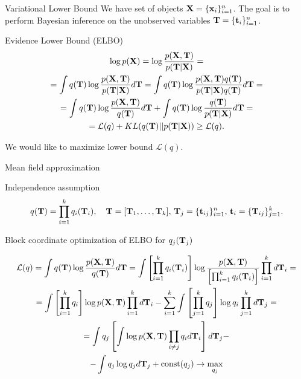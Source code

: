 \begin{frame}{Variational Lower Bound}
    We have set of objects $\mathbf{X} = \{\mathbf{x}_i\}_{i=1}^n$. 
    The goal is to perform Bayesian inference on the unobserved variables $\mathbf{T} = \{\mathbf{t}_i\}_{i=1}^n$.
    \begin{block}{Evidence Lower Bound (ELBO)}
    \vspace{-0.3cm}
        \begin{multline*}
    		\log p(\mathbf{X}) 
    		= \log \frac{p(\mathbf{X}, \mathbf{T})}{p(\mathbf{T}|\mathbf{X})} = \\ 
    		= \int q(\mathbf{T}) \log \frac{p(\mathbf{X}, \mathbf{T})}{p(\mathbf{T}|\mathbf{X})}d\mathbf{T}
    		= \int q(\mathbf{T}) \log \frac{p(\mathbf{X}, \mathbf{T}) q(\mathbf{T})}{p(\mathbf{T}|\mathbf{X}) q(\mathbf{T})} d\mathbf{T} = \\
    		= \int q(\mathbf{T}) \log \frac{p(\mathbf{X}, \mathbf{T})}{q(\mathbf{T})}d\mathbf{T} + \int q(\mathbf{T}) \log \frac{q(\mathbf{T})}{p(\mathbf{T}|\mathbf{X})}d\mathbf{T} = \\ 
    		= \mathcal{L} (q) + KL(q(\mathbf{T}) || p(\mathbf{T}|\mathbf{X})) \geq \mathcal{L} (q).
    	\end{multline*}
        \vspace{-0.3cm}
    \end{block}
	We would like to maximize lower bound $\mathcal{L}(q)$.
\end{frame}
\begin{frame}{Mean field approximation}
    \begin{block}{Independence assumption}
    \vspace{-0.3cm}
    \[
    q(\mathbf{T}) = \prod_{i=1}^k q_i(\mathbf{T}_i), \quad \mathbf{T} = [\mathbf{T}_1, \dots, \mathbf{T}_k], \, \mathbf{T}_j = \{ \mathbf{t}_{ij}\}_{i=1}^n, \, \mathbf{t}_i = \{ \mathbf{T}_{ij}\}_{j=1}^k.
    \]
    \vspace{-0.3cm}
    \end{block}
    \begin{block}{Block coordinate optimization of ELBO for $q_j(\mathbf{T}_j)$}
  
    {\footnotesize
    \vspace{-0.3cm}
        \begin{multline*}
    		\mathcal{L} (q)
    		= \int q(\mathbf{T}) \log \frac{p(\mathbf{X}, \mathbf{T})}{q(\mathbf{T})}d\mathbf{T}
    		= \int \left[\prod_{i=1}^k q_i(\mathbf{T}_i) \right] \log \frac{p(\mathbf{X}, \mathbf{T})}{\left[\prod_{i=1}^k q_i(\mathbf{T}_i) \right]}  \prod_{i=1}^k d \mathbf{T}_i = \\
    		= \int \left[ \prod_{i=1}^k q_i \right] \log p(\mathbf{X}, \mathbf{T}) \prod_{i=1}^k d \mathbf{T}_i  
    		- \sum_{i=1}^k \int \left[ \prod_{j=1}^k q_j \right] \log q_i \prod_{j=1}^k d \mathbf{T}_j = \\
    		= \int q_j \left[\int  \log p(\mathbf{X}, \mathbf{T}) \prod_{i \neq j} q_i d \mathbf{T}_i \right] d \mathbf{T}_j - \\
    		- \int q_j \log q_j d\mathbf{T}_j + \text{const}(q_j) \rightarrow \max_{q_j}
    	\end{multline*}
        \vspace{-0.3cm}}
    \end{block}
\end{frame}
